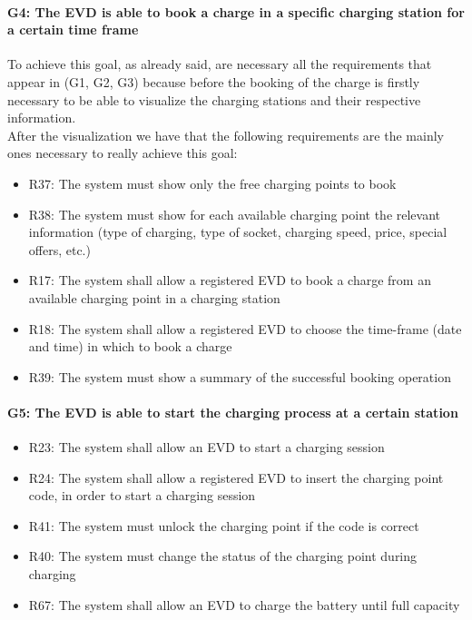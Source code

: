 \paragraph{G4: The EVD is able to book a charge in a specific charging station for a certain time frame}
To achieve this goal, as already said, are necessary all the requirements that appear in (G1, G2, G3) because before the booking of the charge is firstly necessary to be able to visualize the charging stations and their respective information.\\
After the visualization we have that the following requirements are the mainly ones necessary to really achieve this goal:
\begin{itemize}
    \item R37: The system must show only the free charging points to book
    \item R38: The system must show for each available charging point the relevant information (type of charging, type of socket, charging speed, price, special offers, etc.)
    \item R17: The system shall allow a registered EVD to book a charge from an available charging point in a charging station
    \item R18: The system shall allow a registered EVD to choose the time-frame (date and time) in which to book a charge
    \item R39: The system must show a summary of the successful booking operation
\end{itemize}

\paragraph{G5: The EVD is able to start the charging process at a certain station}
\begin{itemize}
    \item R23: The system shall allow an EVD to start a charging session
    \item R24: The system shall allow a registered EVD to insert the charging point code, in order to start a charging session
    \item R41: The system must unlock the charging point if the code is correct
    \item R40: The system must change the status of the charging point during charging
    \item R67: The system shall allow an EVD to charge the battery until full capacity
\end{itemize}

